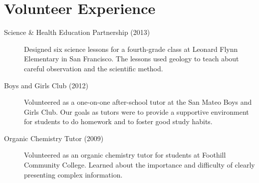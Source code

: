 \section{Volunteer Experience}

\begin{description}

\item[Science \& Health Education Partnership (2013)]
        Designed six science lessons for a fourth-grade class at Leonard Flynn 
        Elementary in San Francisco.  The lessons used geology to teach about 
        careful observation and the scientific method.  

\item[Boys and Girls Club (2012)]
        Volunteered as a one-on-one after-school tutor at the San Mateo Boys 
        and Girls Club.  Our goals as tutors were to provide a supportive 
        environment for students to do homework and to foster good study 
        habits.

\item[Organic Chemistry Tutor (2009)]
        Volunteered as an organic chemistry tutor for students at Foothill 
        Community College.  Learned about the importance and difficulty of 
        clearly presenting complex information.

\end{description}
